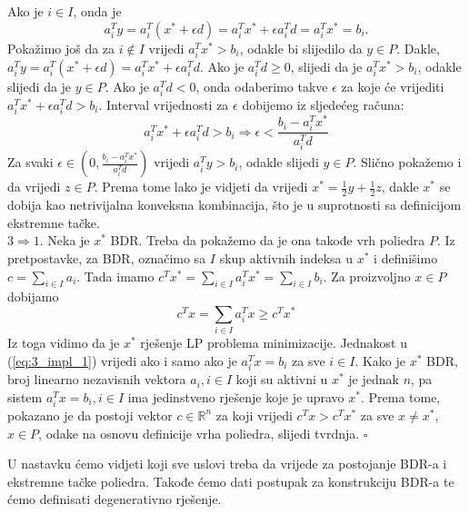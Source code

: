 \documentclass[a4paper, utf8, 11pt, colorlinks]{article}
\newenvironment{proof}{{Dokaz:}}{\hfill$\square$}
\begin{document}
\begin{proof}
       Ako je $i \in I$, onda je $$a_i^T y = a_i^T (x^* + \epsilon d) = a_i^T x^* + \epsilon a_i^T d = a_i^T x^* = b_i. $$
       Pokažimo još da za $i \not \in I$ vrijedi $a_i^T x^* > b_i$, odakle bi slijedilo da $y \in P$. Dakle, $a_i^T y = a_i^T (x^* + \epsilon d) = a_i^T x^* + \epsilon a_i^T d $. Ako je $a_i^T d \geq 0$, slijedi da je 
       $a_i^T x^* > b_i$, odakle slijedi da je $y \in  P$. Ako je $a_i^T d < 0$, onda odaberimo takve $\epsilon$ za koje će vrijediti $a_i^T x^* + \epsilon a_i^T d > b_i$. Interval   vrijednosti za $\epsilon$ dobijemo iz sljedećeg računa:
       $$ a_i^T x^* + \epsilon a_i^T d > b_i \Rightarrow \epsilon < \frac{b_i - a_i^T x^*}{a_i^T d}  $$
       Za svaki $\epsilon \in (0,  \frac{b_i - a_i^T x^*}{a_i^T d} )$ vrijedi $a_i^T y > b_i$, odakle slijedi $y \in P$. Slično pokažemo i da vrijedi $z \in P$. 
       Prema tome lako je vidjeti da vrijedi $x^* = \frac{1}{2}y +\frac{1}{2} z$, dakle $x^*$ se dobija kao netrivijalna konveksna kombinacija, što je u suprotnosti sa definicijom ekstremne tačke. \\
       $3 \Rightarrow 1$. Neka je $x^*$ BDR. Treba da pokažemo da je ona takođe vrh poliedra $P$. Iz pretpostavke, za BDR, označimo sa $I$ skup aktivnih indeksa u $x^*$ i definišimo $c = \sum_{i \in I} a_i$.  Tada imamo 
       $ c^T x^* = \sum_{i \in I } a_i^T x^* = \sum_{i \in I} b_i$. Za proizvoljno $x \in P$ dobijamo
       \begin{equation}\label{eq:3_impl_1}
          c^T x = \sum_{i \in I} a_i^T x \geq c^T x^*  
       \end{equation}
     Iz toga vidimo da je $x^*$ rješenje LP problema minimizacije. Jednakost u (\ref{eq:3_impl_1}) vrijedi ako i samo ako je $a_i^T x = b_i$ za sve $i \in I$. Kako je $x^*$ BDR, broj linearno nezavisnih vektora $a_i, i \in I$ koji su  aktivni u $x^*$ je jednak $n$, pa sistem $a_i^T x = b_i, i \in I$ ima jedinstveno rješenje koje je upravo $x^*$. Prema tome, pokazano je da postoji vektor $c \in \mathbb{R}^n$ za koji vrijedi $c^T x > c^T x^*$ za sve $x \neq x^*$, $x \in P$, odake na osnovu definicije vrha poliedra, slijedi tvrdnja. 
\end{proof}

U nastavku ćemo vidjeti koji sve uslovi treba da vrijede za postojanje BDR-a
i ekstremne tačke poliedra. Takođe ćemo dati postupak za konstrukciju BDR-a te ćemo definisati degenerativno rješenje.
\end{document}
